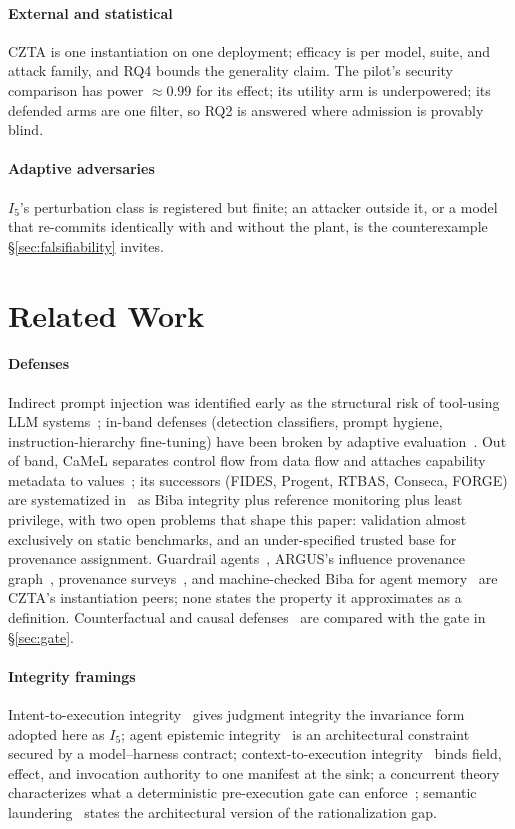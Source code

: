 \documentclass[conference,compsoc]{IEEEtran}
\theoremstyle{definition}
\theoremstyle{plain}
\newcommand{\Ifive}{\ensuremath{I_5}}
\begin{document}
\paragraph*{External and statistical}
CZTA is one instantiation on one deployment; efficacy is per model,
suite, and attack family, and RQ4 bounds the generality claim. The
pilot's security comparison has power $\approx 0.99$ for its effect;
its utility arm is underpowered; its defended arms are one filter, so
RQ2 is answered where admission is provably blind.
\paragraph*{Adaptive adversaries}
\Ifive's perturbation class is registered but finite; an attacker
outside it, or a model that re-commits identically with and without
the plant, is the counterexample \S\ref{sec:falsifiability} invites.


\section{Related Work}
\label{sec:related}
\paragraph*{Defenses}
Indirect prompt injection was identified early as the structural risk
of tool-using LLM systems~\cite{greshake}; in-band defenses (detection
classifiers, prompt hygiene, instruction-hierarchy fine-tuning) have
been broken by adaptive evaluation~\cite{abdelnabi}. Out of band, CaMeL
separates control flow from data flow and attaches capability metadata
to values~\cite{camel}; its successors (FIDES, Progent, RTBAS, Conseca,
FORGE) are systematized in~\cite{oob} as Biba integrity plus reference
monitoring plus least privilege, with two open problems that shape this
paper: validation almost exclusively on static benchmarks, and an
under-specified trusted base for provenance assignment.
Guardrail agents~\cite{guardagent}, ARGUS's influence provenance
graph~\cite{argus}, provenance surveys~\cite{tracessurvey}, and
machine-checked Biba for agent memory~\cite{louck2026tmanm} are CZTA's
instantiation peers; none states the property it approximates as a
definition. Counterfactual and causal
defenses~\cite{melon,agentsentry,causalarmor,liao2026provenance,babu2026gistcmtf,pona2025acf}
are compared with the gate in \S\ref{sec:gate}.

\paragraph*{Integrity framings}
Intent-to-execution integrity~\cite{qu} gives judgment integrity the
invariance form adopted here as \Ifive; agent epistemic
integrity~\cite{shen} is an architectural constraint secured by a
model--harness contract; context-to-execution integrity~\cite{cxi}
binds field, effect, and invocation authority to one manifest at the
sink; a concurrent theory characterizes what a deterministic
pre-execution gate can enforce~\cite{ray2026enforced}; semantic
laundering~\cite{romanchuk2026semantic} states the architectural
version of the rationalization gap.
\end{document}
